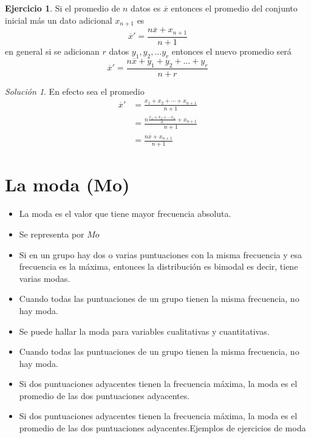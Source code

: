 \documentclass[10pt,]{krantz}
\theoremstyle{definition}
\theoremstyle{definition}
\theoremstyle{definition}
\newtheorem{exercise}{Ejercicio}[chapter]
\theoremstyle{definition}
\theoremstyle{remark}
\newtheorem*{solution}{Solución}
\begin{document}
\begin{exercise}
\protect\hypertarget{exr:unnamed-chunk-9}{}{\label{exr:unnamed-chunk-9} }Si el promedio de \(n\) datos es \(\overline{x}\) entonces el promedio del conjunto inicial más un dato adicional \(x_{n+1}\) es \[\overline{x}'=\frac{n\overline{x}+x_{n+1}}{n+1}\] en general si se adicionan \(r\) datos \(y_1, y_2, \ldots y_r\) entonces el nuevo promedio será \[\overline{x}'=\frac{n\overline{x}+y_{1}+y_2+\ldots+y_r}{n+r}\]
\end{exercise}

\begin{solution}
{}En efecto sea el promedio
\begin{align*}
\overline{x}'&=\frac{x_1+x_2+\cdots+x_{n+1}}{n+1}\\
&=\frac{n\frac{x_1+x_2+\cdots x_n}{n}+x_{n+1}}{n+1}\\
&=\frac{n\overline{x}+x_{n+1}}{n+1}
\end{align*}
\end{solution}

\hypertarget{la-moda-mo}{%
\section{La moda (Mo)}\label{la-moda-mo}}

\begin{itemize}
\item
  La moda es el valor que tiene mayor frecuencia absoluta.
\item
  Se representa por \(Mo\)
\item
  Si en un grupo hay dos o varias puntuaciones con la misma frecuencia y esa frecuencia es la máxima, entonces la distribución es bimodal es decir, tiene varias modas.
\item
  Cuando todas las puntuaciones de un grupo tienen la misma frecuencia, no hay moda.
\item
  Se puede hallar la moda para variables cualitativas y cuantitativas.
\item
  Cuando todas las puntuaciones de un grupo tienen la misma frecuencia, no hay moda.
\item
  Si dos puntuaciones adyacentes tienen la frecuencia máxima, la moda es el promedio de las dos puntuaciones adyacentes.
\item
  Si dos puntuaciones adyacentes tienen la frecuencia máxima, la moda es el promedio de las dos puntuaciones adyacentes.Ejemplos de ejercicios de moda
\end{itemize}
\end{document}
